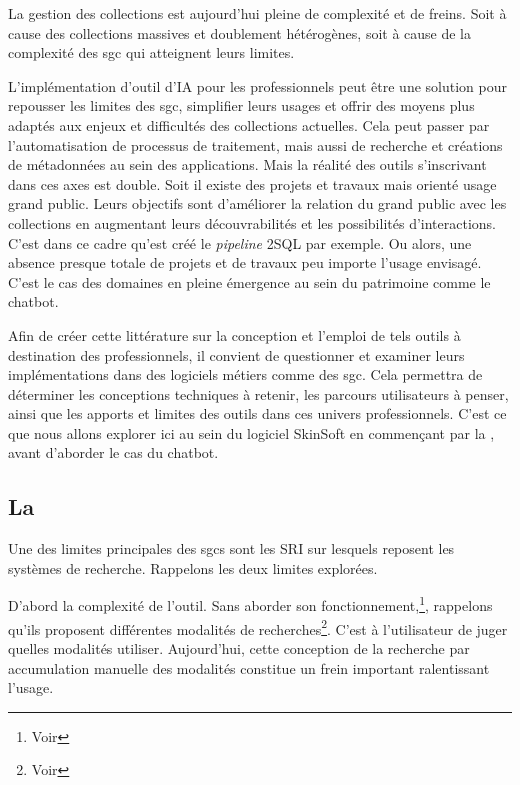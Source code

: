 
La gestion des collections est aujourd'hui pleine de complexité et de freins. Soit à cause des collections massives et doublement hétérogènes, soit à cause de la complexité des \gls{sgc} qui atteignent leurs limites. 

L'implémentation d'outil d'\gls{IA} pour les professionnels peut être une solution pour repousser les limites des \gls{sgc}, simplifier leurs usages et offrir des moyens plus adaptés aux enjeux et difficultés des collections actuelles. Cela peut passer par l'automatisation de processus de traitement, mais aussi de recherche et créations de métadonnées au sein des applications. Mais la réalité des outils s’inscrivant dans ces axes est double. Soit il existe des projets et travaux mais orienté usage grand public. Leurs objectifs sont d'améliorer la relation du grand public avec les collections en augmentant leurs découvrabilités et les possibilités d’interactions. C'est dans ce cadre qu'est créé le \textit{pipeline} \gls{2SQL} par exemple. Ou alors, une absence presque totale de projets et de travaux peu importe l'usage envisagé. C'est le cas des domaines en pleine émergence au sein du patrimoine comme le \gls{chatbot}.

Afin de créer cette littérature sur la conception et l'emploi de tels outils à destination des professionnels, il convient de questionner et examiner leurs implémentations dans des logiciels métiers comme des \gls{sgc}. Cela permettra de déterminer les conceptions techniques à retenir, les parcours utilisateurs à penser, ainsi que les apports et limites des outils dans ces univers professionnels. C'est ce que nous allons explorer ici au sein du logiciel SkinSoft en commençant par la , avant d'aborder le cas du \gls{chatbot}.

\subsection{La }

Une des limites principales des \glspl{sgc} sont les \gls{SRI} sur lesquels reposent les systèmes de recherche. Rappelons les deux limites explorées. 

D'abord la complexité de l'outil. Sans aborder son fonctionnement,\footnote{Voir }, rappelons qu'ils proposent différentes modalités de recherches\footnote{Voir }. C'est à l’utilisateur de juger quelles modalités utiliser. Aujourd'hui, cette conception de la recherche par accumulation manuelle des modalités constitue un frein important ralentissant l'usage. 
	
